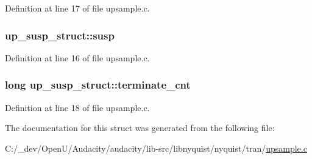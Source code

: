 Definition at line 17 of file upsample.\+c.

\subsubsection[{\texorpdfstring{susp}{susp}}]{ up\+\_\+susp\+\_\+struct\+::susp}\hypertarget{structup__susp__struct_ad3cd762bd1dbff9321ae428baac7eebc}{}\label{structup__susp__struct_ad3cd762bd1dbff9321ae428baac7eebc}


Definition at line 16 of file upsample.\+c.

\subsubsection[{\texorpdfstring{terminate\+\_\+cnt}{terminate_cnt}}]{\setlength{\rightskip}{0pt plus 5cm}long up\+\_\+susp\+\_\+struct\+::terminate\+\_\+cnt}\hypertarget{structup__susp__struct_a1613b3b8f26e114d7a03c2e1c7460c28}{}\label{structup__susp__struct_a1613b3b8f26e114d7a03c2e1c7460c28}


Definition at line 18 of file upsample.\+c.



The documentation for this struct was generated from the following file\+:\begin{DoxyCompactItemize}
\item 
C\+:/\+\_\+dev/\+Open\+U/\+Audacity/audacity/lib-\/src/libnyquist/nyquist/tran/\hyperlink{upsample_8c}{upsample.\+c}\end{DoxyCompactItemize}
